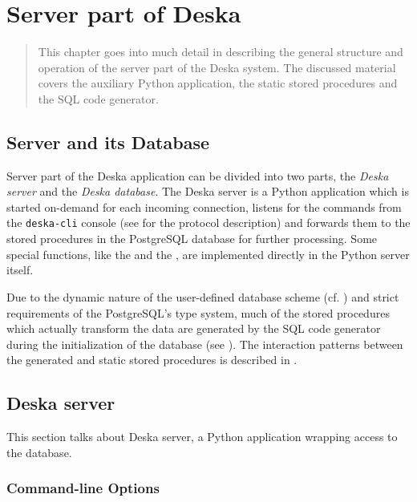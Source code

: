 \documentclass[deska]{subfiles}
\begin{document}
\chapter{Server part of Deska}
\label{sec:deska-server}

\begin{abstract}
This chapter goes into much detail in describing the general structure and operation of the server part of the Deska
system.  The discussed material covers the auxiliary Python application, the static stored procedures and the SQL code
generator.
\end{abstract}

\section{Server and its Database}
Server part of the Deska application can be divided into two parts, the {\em Deska server} and the {\em Deska database}.
The Deska server is a Python application which is started on-demand for each incoming connection, listens for the
commands from the {\tt deska-cli} console (see  for the protocol description) and forwards
them to the stored procedures in the PostgreSQL database for further processing.  Some special functions, like the
 and the , are implemented directly in the Python server
itself.

Due to the dynamic nature of the user-defined database scheme (cf. ) and strict requirements
of the PostgreSQL's type system, much of the stored procedures which actually transform the data are generated by the
SQL code generator during the initialization of the database (see ).  The interaction patterns
between the generated and static stored procedures is described in .

\section{Deska server}
\label{sec:server-py}

This section talks about Deska server, a Python application wrapping access to the database.

\subsection{Command-line Options}
\end{document}
